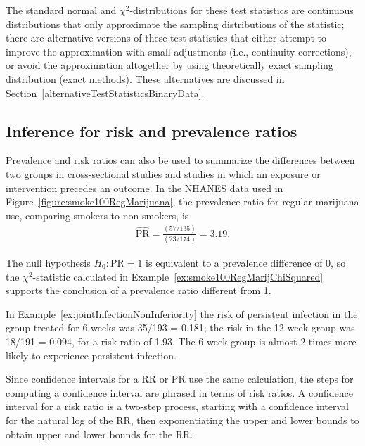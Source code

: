 The standard normal and $\chi^2$-distributions for these test statistics are continuous distributions that only approximate the sampling distributions of the statistic; there are alternative versions of these test statistics that either attempt to improve the approximation with small adjustments (i.e., continuity corrections), or avoid the approximation altogether by using theoretically exact sampling distribution (exact methods).  These alternatives are discussed in Section~\ref{alternativeTestStatisticsBinaryData}.

\subsection{Inference for risk and prevalence ratios}
\label{inferenceRiskRatio}


Prevalence and risk ratios can also be used to summarize the differences between two groups in cross-sectional studies and studies in which an exposure or intervention precedes an outcome.  In the NHANES data used in Figure~\ref{figure:smoke100RegMarijuana}, the prevalence ratio for regular marijuana use, comparing smokers to non-smokers, is
\begin{align*}
      \widehat{\text{PR}} = \frac{(57/135)}{(23/174)} = 3.19.
\end{align*}

The null hypothesis $H_0: \text{PR} = 1$ is equivalent to a prevalence difference of 0, so the $\chi^2$-statistic calculated in Example~\ref{ex:smoke100RegMarijChiSquared} supports the conclusion of a prevalence ratio different from 1.

In Example~\ref{ex:jointInfectionNonInferiority} the risk of persistent infection in the group treated for 6 weeks was 35/193 = 0.181; the risk in the 12 week group was 18/191 = 0.094, for a risk ratio of 1.93.  The 6 week group is almost 2 times more likely to experience persistent infection.

Since confidence intervals for a RR or PR use the same calculation, the steps for computing a confidence interval are phrased in terms of risk ratios. A confidence interval for a risk ratio is a two-step process,  starting with a confidence interval for the natural log of the RR, then exponentiating the upper and lower bounds to obtain upper and lower bounds for the RR.


